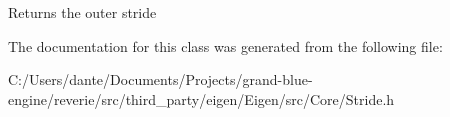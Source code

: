 \begin{DoxyReturn}{Returns}
the outer stride 
\end{DoxyReturn}


The documentation for this class was generated from the following file\+:\begin{DoxyCompactItemize}
\item 
C\+:/\+Users/dante/\+Documents/\+Projects/grand-\/blue-\/engine/reverie/src/third\+\_\+party/eigen/\+Eigen/src/\+Core/Stride.\+h\end{DoxyCompactItemize}
